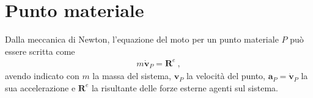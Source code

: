 \documentclass[letterpaper,10pt,english]{jupyterBook}
\begin{document}
\section{Punto materiale}
\label{\detokenize{ch/lagrange-point:punto-materiale}}\label{\detokenize{ch/lagrange-point:classical-mechanics-lagrange-point}}\label{\detokenize{ch/lagrange-point::doc}}
\sphinxAtStartPar
{} Dalla meccanica di Newton, l’equazione del moto per un punto materiale \(P\) può essere scritta come
\begin{equation*}
\begin{split}m \dot{\mathbf{v}}_P = \mathbf{R}^e \ ,\end{split}
\end{equation*}
\sphinxAtStartPar
avendo indicato con \(m\) la massa del sistema, \(\mathbf{v}_P\) la velocità del punto, \(\mathbf{a}_P = \dot{\mathbf{v}}_P\) la sua accelerazione e \(\mathbf{R}^{e}\) la risultante delle forze esterne agenti sul sistema.
\end{document}
